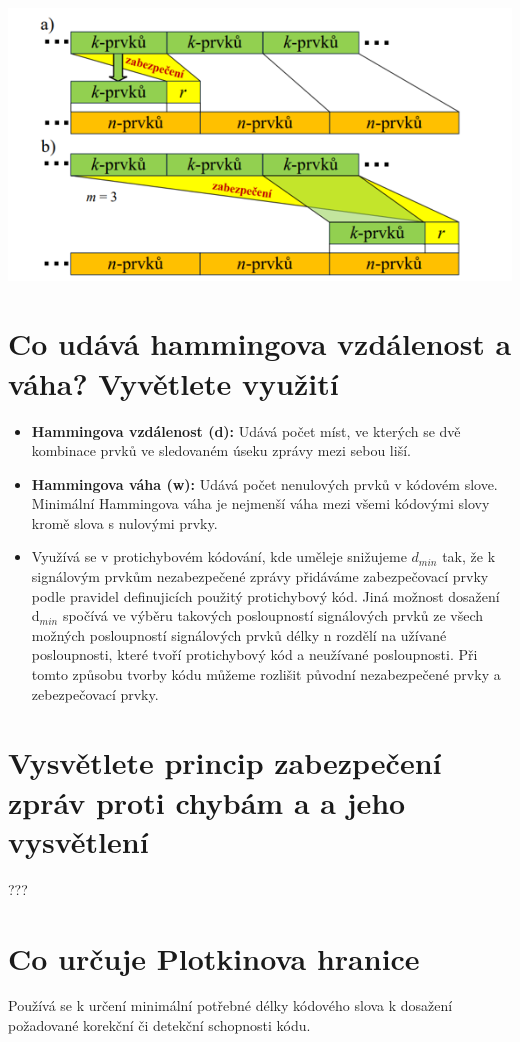 \includegraphics[]{images/zabezpečování.png}

\section{Co udává hammingova vzdálenost a váha? Vyvětlete využití}

\begin{itemize}
    \item \textbf{Hammingova vzdálenost (d):} Udává počet míst, ve kterých se dvě kombinace prvků ve sledovaném úseku zprávy mezi sebou liší.
    

    
    \item \textbf{Hammingova váha (w):} Udává počet nenulových prvků v kódovém slove.
    Minimální Hammingova váha je nejmenší váha mezi všemi kódovými slovy kromě slova s nulovými prvky.
    
    \item Využívá se v protichybovém kódování, kde uměleje snižujeme $d_{min}$ tak, že k signálovým prvkům nezabezpečené zprávy přidáváme zabezpečovací prvky podle pravidel definujicích použitý protichybový kód.
    Jiná možnost dosažení d$_{min}$ spočívá ve výběru takových posloupností signálových prvků ze všech možných posloupností signálových prvků délky n rozdělí na užívané posloupnosti, které tvoří protichybový kód a neužívané posloupnosti.  Při tomto způsobu tvorby kódu můžeme rozlišit původní nezabezpečené prvky a zebezpečovací prvky.
\end{itemize}
\section{Vysvětlete princip zabezpečení zpráv proti chybám a a jeho vysvětlení}
???

\section{Co určuje Plotkinova hranice}
Používá se k určení minimální potřebné délky kódového slova k dosažení požadované korekční či detekční schopnosti kódu.